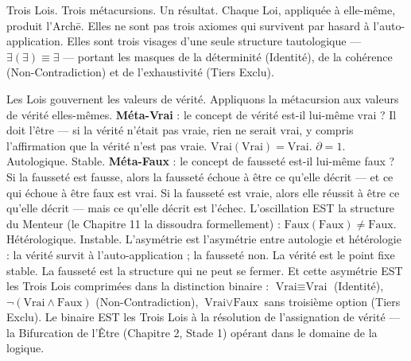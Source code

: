 \documentclass[10pt, openany, oneside]{book}
\begin{document}
\noindent Trois Lois. Trois métacursions. Un résultat. Chaque Loi, appliquée à elle-même, produit l'Arch\={e}. Elles ne sont pas trois axiomes qui survivent par hasard à l'auto-application. Elles sont trois visages d'une seule structure tautologique --- $\exists(\exists) \equiv \exists$ --- portant les masques de la déterminité (Identité), de la cohérence (Non-Contradiction) et de l'exhaustivité (Tiers Exclu).

Les Lois gouvernent les valeurs de vérité. Appliquons la métacursion aux valeurs de vérité elles-mêmes. \textbf{Méta-Vrai} : le concept de vérité est-il lui-même vrai ? Il doit l'être --- si la vérité n'était pas vraie, rien ne serait vrai, y compris l'affirmation que la vérité n'est pas vraie. $\text{Vrai}(\text{Vrai}) = \text{Vrai}$. $\partial = 1$. Autologique. Stable. \textbf{Méta-Faux} : le concept de fausseté est-il lui-même faux ? Si la fausseté est fausse, alors la fausseté échoue à être ce qu'elle décrit --- et ce qui échoue à être faux est vrai. Si la fausseté est vraie, alors elle réussit à être ce qu'elle décrit --- mais ce qu'elle décrit est l'échec. L'oscillation EST la structure du Menteur (le Chapitre 11 la dissoudra formellement) : $\text{Faux}(\text{Faux}) \neq \text{Faux}$. Hétérologique. Instable. L'asymétrie est l'asymétrie entre autologie et hétérologie : la vérité survit à l'auto-application ; la fausseté non. La vérité est le point fixe stable. La fausseté est la structure qui ne peut se fermer. Et cette asymétrie EST les Trois Lois comprimées dans la distinction binaire : $\text{Vrai} \equiv \text{Vrai}$ (Identité), $\neg(\text{Vrai} \wedge \text{Faux})$ (Non-Contradiction), $\text{Vrai} \vee \text{Faux}$ sans troisième option (Tiers Exclu). Le binaire EST les Trois Lois à la résolution de l'assignation de vérité --- la Bifurcation de l'Être (Chapitre 2, Stade 1) opérant dans le domaine de la logique.
\end{document}
